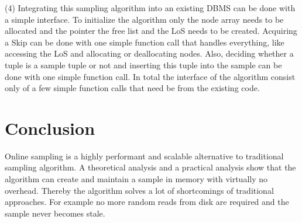 \documentclass[sigconf,nonacm]{acmart}
\begin{document}
        (4) Integrating this sampling algorithm into an existing DBMS can be done with a simple interface. To initialize the algorithm only the node array needs to be allocated and the pointer the free list and the LoS needs to be created. Acquiring a Skip can be done with one simple function call that handles everything, like accessing the LoS and allocating or deallocating nodes. Also, deciding whether a tuple is a sample tuple or not and inserting this tuple into the sample can be done with one simple function call. In total the interface of the algorithm consist only of a few simple function calls that need be from the existing code.

    \section{Conclusion}
        Online sampling is a highly performant and scalable alternative to traditional sampling algorithm. A theoretical analysis and a practical analysis show that the algorithm can create and maintain a sample in memory with virtually no overhead. Thereby the algorithm solves a lot of shortcomings of traditional approaches. For example no more random reads from disk are required and the sample never becomes stale.

    
    
\end{document}
